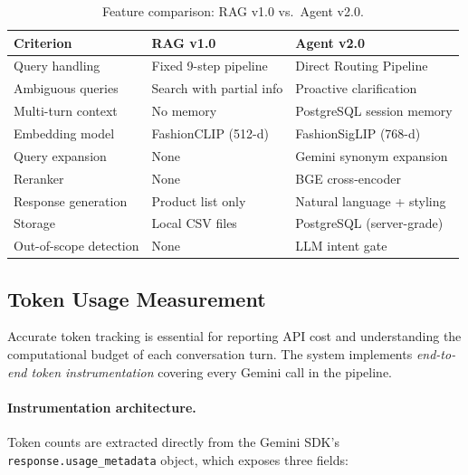 \documentclass[12pt,a4paper]{article}
\begin{document}
\begin{table}[H]
\centering
\begin{tabularx}{\linewidth}{lXX}
\toprule
\textbf{Criterion} & \textbf{RAG v1.0} & \textbf{Agent v2.0} \\
\midrule
Query handling      & Fixed 9-step pipeline          & Direct Routing Pipeline \\
Ambiguous queries   & Search with partial info        & Proactive clarification \\
Multi-turn context  & No memory                       & PostgreSQL session memory \\
Embedding model     & FashionCLIP (512-d)             & FashionSigLIP (768-d) \\
Query expansion     & None                            & Gemini synonym expansion \\
Reranker            & None                            & BGE cross-encoder \\
Response generation & Product list only               & Natural language + styling \\
Storage             & Local CSV files                 & PostgreSQL (server-grade) \\
Out-of-scope detection & None                         & LLM intent gate \\
\bottomrule
\end{tabularx}
\caption{Feature comparison: RAG v1.0 vs.\ Agent v2.0.}
\label{tab:compare}
\end{table}

\subsection{Token Usage Measurement}
\label{sec:token}

Accurate token tracking is essential for reporting API cost and
understanding the computational budget of each conversation turn.
The system implements \emph{end-to-end token instrumentation}
covering every Gemini call in the pipeline.

\paragraph{Instrumentation architecture.}

Token counts are extracted directly from the Gemini SDK's
\texttt{response.usage\_metadata} object, which exposes three fields:
\end{document}

